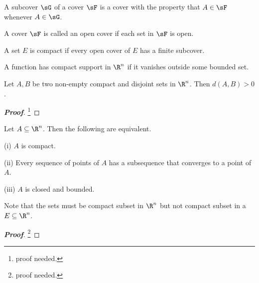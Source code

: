 \begin{definition}
A subcover $\sG$ of a cover $\sF$ is a cover with the property that $A \in \sF$ whenever $A \in \sG$.
\end{definition}

\begin{definition}
A cover $\sF$ is called an open cover if each set in $\sF$ is open.
\end{definition}

\begin{definition}
A set $E$ is compact if every open cover of $E$ has a finite subcover.
\end{definition}

\begin{definition}
A function has compact support in $\R^n$ if it vanishes outside some bounded set.
\end{definition}


\begin{lemma}\label{lem:compact_disjoint_sets_real_n_imples_distance_positive}
Let $A,B$ be two non-empty compact and disjoint sets in $\R^n$. Then $d(A,B)>0$.
\end{lemma}

\begin{proof}[\bf Proof]
\footnote{proof needed.}
\end{proof}


\begin{theorem}\label{thm:heine_borel_compact_real_n_closed_bounded}
Let $A \subseteq \R^n$. Then the following are equivalent.
\ben
\item [(i)] $A$ is compact.
\item [(ii)] Every sequence of points of $A$ has a subsequence that converges to a point of $A$.
\item [(iii)] $A$ is closed and bounded.
\een
\end{theorem}

\begin{remark}
Note that the sets must be compact subset in $\R^n$ but not compact subset in a $E\subseteq \R^n$.
\end{remark}


\begin{proof}[\bf Proof]
\footnote{proof needed.}
\end{proof}

